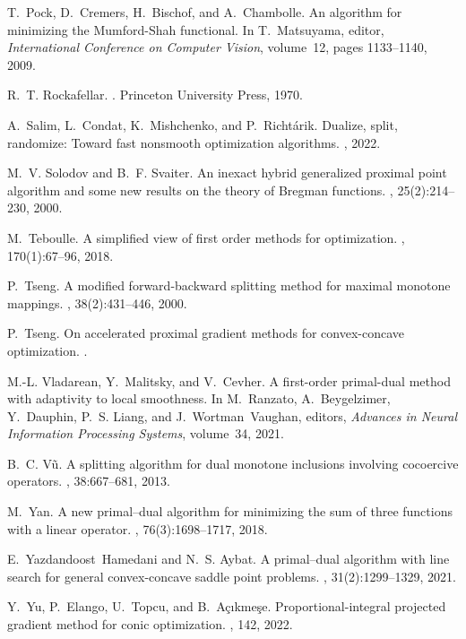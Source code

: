 \documentclass[letterpaper,11pt]{article}
\begin{document}
\begin{thebibliography}{10}
T.~Pock, D.~Cremers, H.~Bischof, and A.~Chambolle.
\newblock An algorithm for minimizing the {Mumford-Shah} functional.
\newblock In T.~Matsuyama, editor, {\em International Conference on Computer
  Vision}, volume~12, pages 1133--1140, 2009.

R.~T. Rockafellar.
.
\newblock Princeton University Press, 1970.

A.~Salim, L.~Condat, K.~Mishchenko, and P.~Richt{\'a}rik.
\newblock Dualize, split, randomize: {T}oward fast nonsmooth optimization algorithms.
, 2022.

M.~V. Solodov and B.~F. Svaiter.
\newblock An inexact hybrid generalized proximal point algorithm and some new
  results on the theory of {Bregman} functions.
, 25(2):214--230, 2000.

M.~Teboulle.
\newblock A simplified view of first order methods for optimization.
, 170(1):67--96, 2018.

P.~Tseng.
\newblock A modified forward-backward splitting method for maximal monotone
  mappings.
, 38(2):431--446, 2000.

P.~Tseng.
\newblock On accelerated proximal gradient methods for convex-concave
  optimization.
.

M.-L. Vladarean, Y.~Malitsky, and V.~Cevher.
\newblock A first-order primal-dual method with adaptivity to local smoothness.
\newblock In M.~Ranzato, A.~Beygelzimer, Y.~Dauphin, P.~S. Liang, and
  J.~Wortman~Vaughan, editors, {\em Advances in Neural Information Processing
  Systems}, volume~34, 2021.

B.~C. V{\~u}.
\newblock A splitting algorithm for dual monotone inclusions involving
  cocoercive operators.
, 38:667--681, 2013.

M.~Yan.
\newblock A new primal--dual algorithm for minimizing the sum of three
  functions with a linear operator.
, 76(3):1698--1717, 2018.

E.~Yazdandoost~Hamedani and N.~S. Aybat.
\newblock A primal--dual algorithm with line search for general convex-concave
  saddle point problems.
, 31(2):1299--1329, 2021.

Y.~Yu, P.~Elango, U.~Topcu, and B.~A{\c{c}}{\i}kme{\c{s}}e.
\newblock Proportional-integral projected gradient method for conic
  optimization.
, 142, 2022.

\end{thebibliography}
\end{document}
